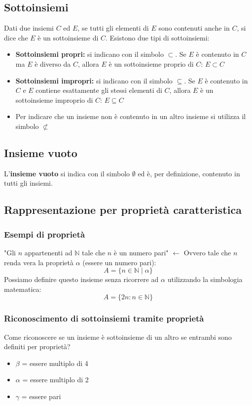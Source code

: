 \documentclass[oneside,10pt]{book} %
\newcommand{\sube}{\subseteq}
\newcommand{\sub}{\subset}
\newcommand{\notsub}{\not\subset}
\newcommand{\N}{\mathbb{N}}
\begin{document}
\subsection{Sottoinsiemi}
Dati due insiemi $C$ ed $E$, se tutti gli elementi di $E$ sono contenuti anche in $C$, si dice che $E$ è un sottoinsieme di $C$.
Esistono due tipi di sottoinsiemi:
\begin{itemize}
    \item \textbf{Sottoinsiemi propri:} si indicano con il simbolo $\sub$. Se $E$ è contenuto in $C$ ma $E$ è diverso da $C$, allora $E$ è un sottoinsieme proprio di $C$: $E \sub C$
    \item \textbf{Sottoinsiemi impropri:} si indicano con il simbolo $\sube$. Se $E$ è contenuto in $C$ e $E$ contiene esattamente gli stessi elementi di $C$, allora $E$ è un sottoinsieme improprio di $C$: $E \sube C$
    \item Per indicare che un insieme non è contenuto in un altro insieme si utilizza il simbolo $\notsub$
\end{itemize}

\subsection{Insieme vuoto}
L'\textbf{insieme vuoto} si indica con il simbolo $\emptyset$ ed è, per definizione, contenuto in tutti gli insiemi.

\subsection{Rappresentazione per proprietà caratteristica}


\subsubsection{Esempi di proprietà}
"Gli $n$ appartenenti ad $\N$ tale che $n$ è un numero pari" $\leftarrow$ Ovvero tale che $n$ renda vera la proprietà $\alpha$ (essere un numero pari):
\[
A = \{n \in \N \mid \alpha\}
\]
Possiamo definire questo insieme senza ricorrere ad $\alpha$ utilizzando la simbologia matematica:
\[
A = \{2n : n \in \N\}
\]


\subsubsection{Riconoscimento di sottoinsiemi tramite proprietà}
Come riconoscere se un insieme è sottoinsieme di un altro se entrambi sono definiti per proprietà?
\begin{itemize}
    \item $\beta$ = essere multiplo di 4
    \item $\alpha$ = essere multiplo di 2
    \item $\gamma$ = essere pari
\end{itemize}
\end{document}
